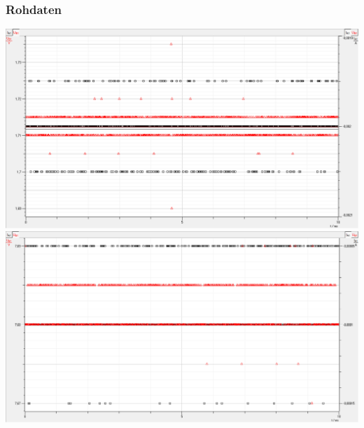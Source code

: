 \documentclass[12pt,a4paper]{article}
\begin{document}
\subsubsection{Rohdaten}
\includegraphics[scale=0.6]{Rauschmessung1.png}
\includegraphics[scale=0.575]{Rauschmessung2.png}  
\newpage
\end{document}
